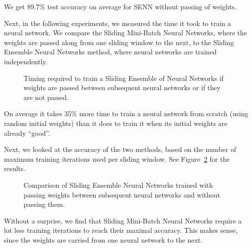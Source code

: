 \documentclass[conference]{IEEEtran}
\begin{document}
		We get 89.7\% test accuracy on average for SENN without passing of weights.
		
		Next, in the following experiments, we measured the time it took to train a neural network. We compare the Sliding Mini-Batch Neural Networks, where the weights are passed along from one sliding window to the next, to the Sliding Ensemble Neural Networks method, where neural networks are trained independently.
		
		\begin{figure}[H]
			\centering
			\caption{Timing required to train a Sliding Ensemble of Neural Networks if weights are passed between subsequent neural networks or if they are not passed.}
			\label{fig:results-nnet-ens-timing}
		\end{figure}
		
		On average it takes 35\% more time to train a neural network from scratch (using random initial weights) than it does to train it when its initial weights are already ``good''.
		
		Next, we looked at the accuracy of the two methods, based on the number of maximum training iterations used per sliding window. See Figure~\ref{fig:maxit} for the results.
		\begin{figure}[H]
			\centering
			\caption{Comparison of Sliding Ensemble Neural Networks trained with passing weights between subsequent neural networks and without passing them.}
			\label{fig:maxit}
		\end{figure}
		
		Without a surprise, we find that Sliding Mini-Batch Neural Networks require a lot less training iterations to reach their maximal accuracy. This makes sense, since the weights are carried from one neural network to the next. 
		
		
		
\end{document}
